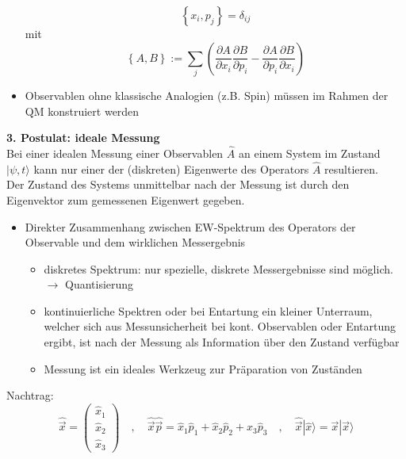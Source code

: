 \documentclass[10pt,article,colorback,accentcolor=tud9d]{scrartcl}
\begin{document}
\begin{itemize}
        \begin{equation}
         \left\{x_i,p_j\right\}=\delta_{ij}
        \end{equation}
        mit 
        \begin{equation}
        \left\{A,B\right\}:=\sum_j\left(\frac{\partial A}{\partial x_i}\frac{\partial B}{\partial p_i}-\frac{\partial A}{\partial p_i}\frac{\partial B}{\partial x_i}\right)
        \end{equation}
      \item Observablen ohne klassische Analogien (z.B. Spin) müssen im Rahmen der QM konstruiert werden
    \end{itemize}
  \textbf{3. Postulat: ideale Messung}\\
    Bei einer idealen Messung einer Observablen $\hat{A}$ an einem System im Zustand $|\psi,t\rangle$ kann nur einer der (diskreten) Eigenwerte des Operators $\hat{A}$ resultieren.\\
    Der Zustand des Systems unmittelbar nach der Messung ist durch den Eigenvektor zum gemessenen Eigenwert gegeben.
    \begin{itemize}
      \item Direkter Zusammenhang zwischen EW-Spektrum des Operators der Observable und dem wirklichen Messergebnis
        \begin{itemize}
          \item diskretes Spektrum: nur spezielle, diskrete Messergebnisse sind möglich. $\rightarrow$ Quantisierung
          \item kontinuierliche Spektren oder bei Entartung ein kleiner Unterraum, welcher sich aus Messunsicherheit bei kont. Observablen oder Entartung ergibt, ist nach der Messung als Information über den Zustand verfügbar
          \item Messung ist ein ideales Werkzeug zur Präparation von Zuständen
        \end{itemize}
    \end{itemize}
    Nachtrag: 
    \begin{equation}
      \hat{\vec{x}}=\left(\begin{array}{c} \hat{x}_1 \\ \hat{x}_2 \\ \hat{x}_3 \end{array}\right) \quad, \quad \hat{\vec{x}}\hat{\vec{p}}=\hat{x}_1\hat{p}_1 + \hat{x}_2\hat{p}_2 + \hat{x}_3\hat{p}_3 \quad, \quad \hat{\vec{x}}|\hat{x}\rangle=\vec{x}|\vec{x}\rangle
    \end{equation}
\end{document}
